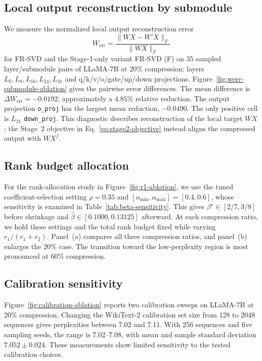 \subsection{Local output reconstruction by submodule}\label{app:submodule-reconstruction}
We measure the normalized local output reconstruction error
\begin{equation}
W_{\mathrm{err}}=\frac{\|WX-W'X\|_F}{\|WX\|_F}
\label{eq:app-werr}
\end{equation}
for FR-SVD and the Stage-1-only variant FR-SVD (F) on $35$ sampled layer/submodule pairs of LLaMA-7B at $20\%$ compression: layers $L_0,L_8,L_{16},L_{24},L_{31}$ and q/k/v/o/gate/up/down projections. Figure~\ref{fig:werr-submodule-ablation} gives the pairwise error differences. The mean difference is $\Delta W_{\mathrm{err}}=-0.0192$, approximately a $4.85\%$ relative reduction. The output projection \texttt{o\_proj} has the largest mean reduction, $-0.0490$. The only positive cell is $L_{31}$ \texttt{down\_proj}. This diagnostic describes reconstruction of the local target $WX$; the Stage~2 objective in Eq.~\eqref{eq:stage2-objective} instead aligns the compressed output with $WX^f$.



\subsection{Rank budget allocation}\label{app:rank-allocation}
For the rank-allocation study in Figure~\ref{fig:r1-ablation}, we use the tuned coefficient-selection setting $\rho=0.35$ and $[\alpha_{\min},\alpha_{\max}]=[0.4,0.6]$, whose sensitivity is examined in Table~\ref{tab:beta-sensitivity}. This gives $\beta^\star\in[2/7,3/8]$ before shrinkage and $\widehat\beta\in[0.1000,0.13125]$ afterward. At each compression ratio, we hold these settings and the total rank budget fixed while varying $r_1/(r_1+r_2)$. Panel~(a) compares all three compression ratios, and panel~(b) enlarges the $20\%$ case. The transition toward the low-perplexity region is most pronounced at $60\%$ compression.



\subsection{Calibration sensitivity}\label{app:calibration-sensitivity}
Figure~\ref{fig:calibration-ablation} reports two calibration sweeps on LLaMA-7B at 20\% compression. Changing the WikiText-2 calibration set size from 128 to 2048 sequences gives perplexities between 7.02 and 7.11. With 256 sequences and five sampling seeds, the range is 7.02--7.08, with mean and sample standard deviation $7.052\pm0.024$. These measurements show limited sensitivity to the tested calibration choices.

